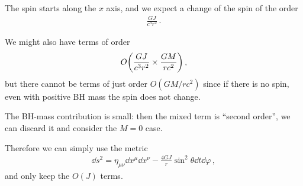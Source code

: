 \documentclass[main.tex]{subfiles}
\begin{document}
The spin starts along the \(x\) axis, and we expect a change of the spin of the order 
%
\begin{align}
  \frac{GJ}{c^3r^2}
\,.
\end{align}

We might also have terms of order 
%
\begin{align}
  O \qty(\frac{GJ}{c^3r^2} \times \frac{GM}{rc^2 })
\,,
\end{align}
%
but there cannot be terms of just order \(O(GM/rc^2)\) since if there is no spin, even with positive BH mass the spin does not change. 

The BH-mass contribution is small: then the mixed term is ``second order'', we can discard it and consider the \(M=0\) case. 

Therefore we can simply use the metric 
%
\begin{align}
  \dd{s^2} = \eta_{\mu \nu } \dd{x^{\mu }} \dd{x^{\nu }}
  - \frac{4GJ}{r} \sin^2 \theta \dd{t} \dd{\varphi }
\,,
\end{align}
%
and only keep the \(O(J)\) terms. 
\end{document}
